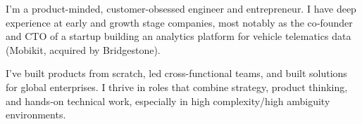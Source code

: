 

\begin{cvparagraph}


I'm a product-minded, customer-obsessed engineer and entrepreneur. I have deep experience at early and growth stage companies, most notably as the co‐founder and CTO of a startup building an analytics platform for vehicle telematics data (Mobikit, acquired by Bridgestone).

I've built products from scratch, led cross-functional teams, and built solutions for global enterprises. I thrive in roles that combine strategy, product thinking, and hands‐on technical work, especially in high complexity/high ambiguity environments.

\end{cvparagraph}
